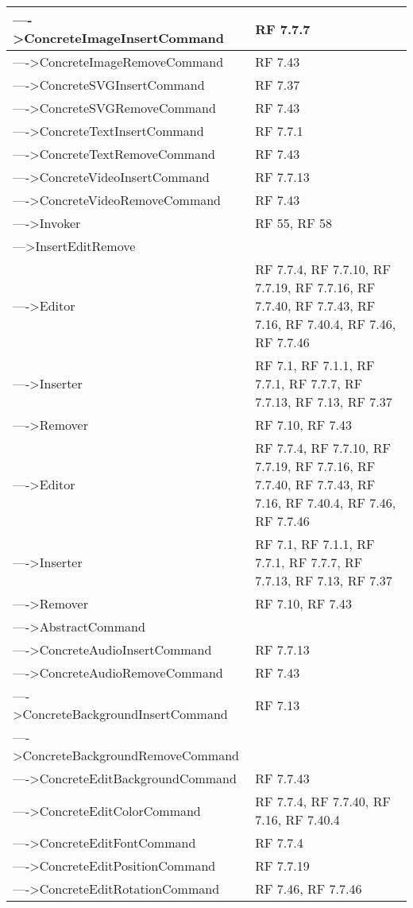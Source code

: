 {\begin{longtable} [c]{| p{8cm} | p{5cm} |}
 \hline 
---->ConcreteImageInsertCommand & RF 7.7.7\\ 
 \hline 
---->ConcreteImageRemoveCommand & RF 7.43\\ 
 \hline 
---->ConcreteSVGInsertCommand & RF 7.37\\ 
 \hline 
---->ConcreteSVGRemoveCommand & RF 7.43\\ 
 \hline 
---->ConcreteTextInsertCommand & RF 7.7.1\\ 
 \hline 
---->ConcreteTextRemoveCommand & RF 7.43\\ 
 \hline 
---->ConcreteVideoInsertCommand & RF 7.7.13\\ 
 \hline 
---->ConcreteVideoRemoveCommand & RF 7.43\\ 
 \hline 
---->Invoker & RF 55, RF 58\\ 
 \hline 
--->InsertEditRemove & \\ 
 \hline 
---->Editor & RF 7.7.4, RF 7.7.10, RF 7.7.19, RF 7.7.16, RF 7.7.40, RF 7.7.43, RF 7.16, RF 7.40.4, RF 7.46, RF 7.7.46\\ 
 \hline 
---->Inserter & RF 7.1, RF 7.1.1, RF 7.7.1, RF 7.7.7, RF 7.7.13, RF 7.13, RF 7.37\\ 
 \hline 
---->Remover & RF 7.10, RF 7.43\\ 
 \hline 
---->Editor & RF 7.7.4, RF 7.7.10, RF 7.7.19, RF 7.7.16, RF 7.7.40, RF 7.7.43, RF 7.16, RF 7.40.4, RF 7.46, RF 7.7.46\\ 
 \hline 
---->Inserter & RF 7.1, RF 7.1.1, RF 7.7.1, RF 7.7.7, RF 7.7.13, RF 7.13, RF 7.37\\ 
 \hline 
---->Remover & RF 7.10, RF 7.43\\ 
 \hline 
---->AbstractCommand & \\ 
 \hline 
---->ConcreteAudioInsertCommand & RF 7.7.13\\ 
 \hline 
---->ConcreteAudioRemoveCommand & RF 7.43\\ 
 \hline 
---->ConcreteBackgroundInsertCommand & RF 7.13\\ 
 \hline 
---->ConcreteBackgroundRemoveCommand & \\ 
 \hline 
---->ConcreteEditBackgroundCommand & RF 7.7.43\\ 
 \hline 
---->ConcreteEditColorCommand & RF 7.7.4, RF 7.7.40, RF 7.16, RF 7.40.4\\ 
 \hline 
---->ConcreteEditFontCommand & RF 7.7.4\\ 
 \hline 
---->ConcreteEditPositionCommand & RF 7.7.19\\ 
 \hline 
---->ConcreteEditRotationCommand & RF 7.46, RF 7.7.46\\ 

\end{longtable}}
